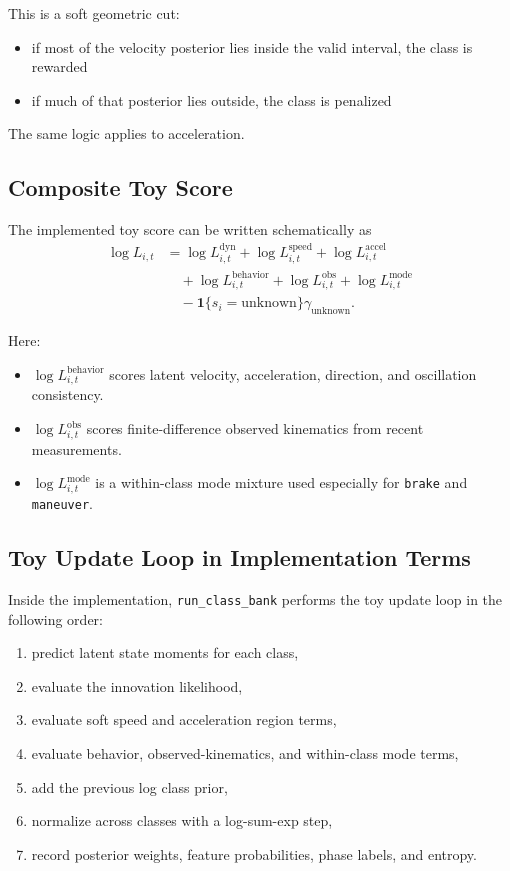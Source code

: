 \documentclass[11pt]{article}
\begin{document}
This is a soft geometric cut:
\begin{itemize}[leftmargin=1.5em]
    \item if most of the velocity posterior lies inside the valid interval, the
    class is rewarded
    \item if much of that posterior lies outside, the class is penalized
\end{itemize}

The same logic applies to acceleration.

\subsection{Composite Toy Score}

The implemented toy score can be written schematically as
\begin{align}
    \log L_{i,t}
    &=
    \log L^{\text{dyn}}_{i,t}
    + \log L^{\text{speed}}_{i,t}
    + \log L^{\text{accel}}_{i,t} \\
    &\quad
    + \log L^{\text{behavior}}_{i,t}
    + \log L^{\text{obs}}_{i,t}
    + \log L^{\text{mode}}_{i,t} \nonumber \\
    &\quad
    - \mathbf{1}\{s_i = \text{unknown}\}\gamma_{\text{unknown}}. \nonumber
\end{align}

Here:
\begin{itemize}[leftmargin=1.5em]
    \item $\log L^{\text{behavior}}_{i,t}$ scores latent velocity,
    acceleration, direction, and oscillation consistency.
    \item $\log L^{\text{obs}}_{i,t}$ scores finite-difference observed
    kinematics from recent measurements.
    \item $\log L^{\text{mode}}_{i,t}$ is a within-class mode mixture used
    especially for \texttt{brake} and \texttt{maneuver}.
\end{itemize}

\subsection{Toy Update Loop in Implementation Terms}

Inside the implementation, \texttt{run\_class\_bank} performs the toy update
loop in the following order:
\begin{enumerate}[leftmargin=1.8em]
    \item predict latent state moments for each class,
    \item evaluate the innovation likelihood,
    \item evaluate soft speed and acceleration region terms,
    \item evaluate behavior, observed-kinematics, and within-class mode terms,
    \item add the previous log class prior,
    \item normalize across classes with a log-sum-exp step,
    \item record posterior weights, feature probabilities, phase labels, and
    entropy.
\end{enumerate}
\end{document}
